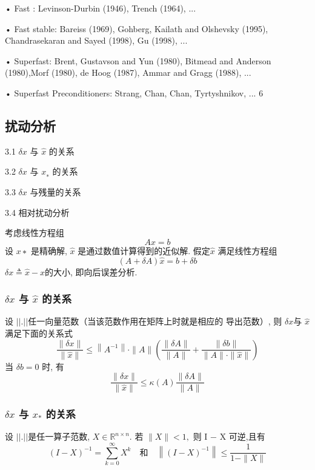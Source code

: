 \documentclass[12pt,a4paper]{article}
\begin{document}
• Fast : Levinson-Durbin (1946), Trench (1964), ...

• Fast stable: Bareiss (1969), Gohberg, Kailath and Olshevsky (1995), Chandrasekaran and Sayed (1998), Gu (1998), ...

• Superfast: Brent, Gustavson and Yun (1980), Bitmead and Anderson (1980),Morf (1980), de Hoog (1987), Ammar and Gragg (1988), ...

• Superfast Preconditioners: Strang, Chan, Chan, Tyrtyshnikov, ...
6


\subsection{扰动分析}

3.1 $δx$ 与 $\hat{x}$ 的关系

3.2 $δx$ 与 $x_∗$ 的关系

3.3 $δx$ 与残量的关系

3.4 相对扰动分析


考虑线性方程组
\begin{equation}
A x=b
\end{equation}
设 $x∗$ 是精确解, $\hat{x}$ 是通过数值计算得到的近似解. 假定$ \hat{x}$ 满足线性方程组
\begin{equation}
(A+\delta A) \hat{x}=b+\delta b
\end{equation}
$\delta x \triangleq \hat{x}-x$的大小, 即向后误差分析.

\subsubsection{$δx$ 与 $\hat{x}$ 的关系}
\begin{framed}
	\begin{theorem}
		设 $||.||$任一向量范数（当该范数作用在矩阵上时就是相应的
		导出范数）, 则 $δx $与 $\hat{x}$ 满足下面的关系式
		\begin{equation}
		\frac{\|\delta x\|}{\|\hat{x}\|} \leq\left\|A^{-1}\right\| \cdot\|A\|\left(\frac{\|\delta A\|}{\|A\|}+\frac{\|\delta b\|}{\|A\| \cdot\|\hat{x}\|}\right)
		\end{equation}
		当 $δb = 0$ 时, 有
		\begin{equation}
		\frac{\|\delta x\|}{\|\hat{x}\|} \leq \kappa(A) \frac{\|\delta A\|}{\|A\|}
		\end{equation}
	\end{theorem}
\end{framed}

\subsubsection{$δx$ 与 $x_{*}$ 的关系}
\begin{framed}
	\begin{lemma}
		设 $||.||$是任一算子范数, $X ∈\mathbb{R}^{n×n}$. 若 $∥X∥ < 1,$ 则 I − X 可逆,且有
		\begin{equation}
		(I-X)^{-1}=\sum_{k=0}^{\infty} X^{k} \quad \text{和} \quad\left\|(I-X)^{-1}\right\| \leq \frac{1}{1-\|X\|}
		\end{equation}
	\end{lemma}
\end{framed}
\end{document}
